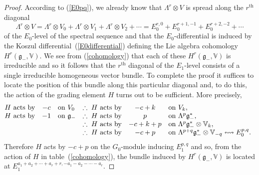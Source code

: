 \documentclass[11pt]{article}
\begin{document}
\begin{proof} According to (\ref{E0pq}), we already know that
$\Lambda^r\otimes V$ is spread along the
$r^{\mathrm{th}}$ diagonal
\[\Lambda^r\otimes V=\Lambda^r\otimes V_0+\Lambda^r\otimes
V_1+\Lambda^r\otimes V_2+\cdots =
E_0^{r,0}+E_0^{r+1,-1}+E_0^{r+2,-2}+\cdots\]
of the $E_0$-level of the spectral sequence and that the $E_0$-dif\/ferential is
induced by the Koszul dif\/ferential~(\ref{E0differential}) def\/ining the Lie
algebra cohomology $H^r({\mathfrak{g}}_-,{\mathbb{V}})$. We see from
(\ref{cohomology}) that each of these $H^r({\mathfrak{g}}_-,{\mathbb{V}})$ is
irreducible and so it follows that the $r^{\mathrm{th}}$ diagonal of the
$E_1$-level consists of a single irreducible homogeneous vector bundle. To
complete the proof it suf\/f\/ices to locate the position of this bundle along this
particular diagonal and, to do this, the action of the grading element $H$
turns out to be suf\/f\/icient. More precisely,
\[\begin{array}{@{}rclrcl}
H\mbox{ acts by}&-c&\mbox{on }V_0&
\therefore\;H\mbox{ acts by}&-c+k&\mbox{on }V_k,\\
H\mbox{ acts by}&-1&\mbox{on }{\mathfrak{g}}_-&
\therefore\;H\mbox{ acts by}&p&\mbox{on }\Lambda^p{\mathfrak{g}}_-^*,\\
&&&\therefore\;H\mbox{ acts by}&-c+k+p&\mbox{on }
\Lambda^p{\mathfrak{g}}_-^*\otimes{\mathbb{V}}_k,\\
&&&\therefore\;H\mbox{ acts by}&-c+p&\mbox{on }
\Lambda^{p+q}{\mathfrak{g}}_-^*\otimes{\mathbb{V}}_{-q}\leftrightsquigarrow
E_0^{p,q}.
\end{array}\]
Therefore $H$ acts by $-c+p$ on the $G_0$-module inducing $E_1^{p,q}$ and so,
from the action of $H$ in table~(\ref{cohomology}), the bundle induced by
$H^r({\mathfrak{g}}_-,{\mathbb{V}})$ is located at
$E_1^{a_1+a_2+\cdots+a_r+r,-a_1-a_2-\cdots-a_r}$.


\end{proof}
\end{document}
